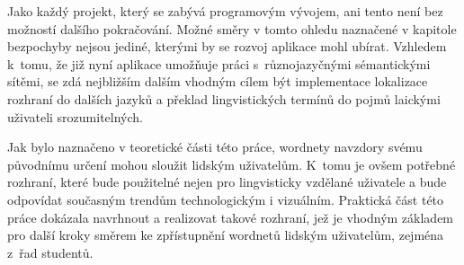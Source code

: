 \documentclass[a4paper, 11pt, oneside, showtrims]{book}
\newcommand{\itNameRef}[1]{\textit{\nameref{#1}}}
\begin{document}
			Jako každý projekt, který se zabývá programovým vývojem, ani tento není bez možností dalšího pokračování. Možné směry v tomto ohledu naznačené v kapitole \itNameRef{cha:co-se-nestihlo} bezpochyby nejsou jediné, kterými by se rozvoj aplikace mohl ubírat. Vzhledem k~tomu, že již nyní aplikace umožňuje práci s~různojazyčnými sémantickými sítěmi, se zdá nejbližším dalším vhodným cílem být implementace lokalizace rozhraní do dalších jazyků a překlad lingvistických termínů do pojmů laickými uživateli srozumitelných.

			Jak bylo naznačeno v teoretické části této práce, wordnety navzdory svému původnímu určení mohou sloužit lidským uživatelům. K~tomu je ovšem potřebné rozhraní, které bude použitelné nejen pro lingvisticky vzdělané uživatele a bude odpovídat současným trendům technologickým i vizuálním. Praktická část této práce dokázala navrhnout a realizovat takové rozhraní, jež je vhodným základem pro další kroky směrem ke zpřístupnění wordnetů lidským uživatelům, zejména z~řad studentů.








			


 
	\printbibliography[]

\end{document}
